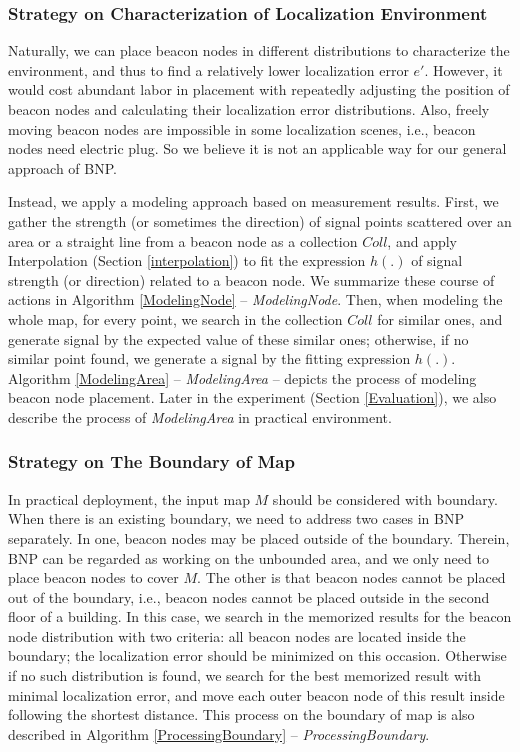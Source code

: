 \documentclass[10pt, conference, letterpaper]{IEEEtran}
\begin{document}
\subsubsection{Strategy on Characterization of Localization Environment}
Naturally, we can place beacon nodes in different distributions to characterize the environment, and thus to find a relatively lower localization error $e'$. However, it would cost abundant labor in placement with repeatedly adjusting the position of beacon nodes and calculating their localization error distributions. Also, freely moving beacon nodes are impossible in some localization scenes, i.e., beacon nodes need electric plug. So we believe it is not an applicable way for our general approach of BNP.

Instead, we apply a modeling approach based on measurement results. First, we gather the strength (or sometimes the direction) of signal points scattered over an area or a straight line from a beacon node as a collection $Coll$, and apply Interpolation (Section \ref{interpolation}) to fit the expression $h(.)$ of signal strength (or direction) related to a beacon node. We summarize these course of actions in Algorithm \ref{ModelingNode} -- \textit{ModelingNode}. Then, when modeling the whole map, for every point, we search in the collection $Coll$ for similar ones, and generate signal by the expected value of these similar ones; otherwise, if no similar point found, we generate a signal by the fitting expression $h(.)$. Algorithm \ref{ModelingArea} -- \textit{ModelingArea} -- depicts the process of modeling beacon node placement. Later in the experiment (Section \ref{Evaluation}), we also describe the process of \textit{ModelingArea} in practical environment.

\subsubsection{Strategy on The Boundary of Map}
In practical deployment, the input map $M$ should be considered with boundary. When there is an existing boundary, we need to address two cases in BNP separately. In one, beacon nodes may be placed outside of the boundary. Therein, BNP can be regarded as working on the unbounded area, and we only need to place beacon nodes to cover $M$. The other is that beacon nodes cannot be placed out of the boundary, i.e., beacon nodes cannot be placed outside in the second floor of a building. In this case, we search in the memorized results for the beacon node distribution with two criteria: all beacon nodes are located inside the boundary; the localization error should be minimized on this occasion. Otherwise if no such distribution is found, we search for the best memorized result with minimal localization error, and move each outer beacon node of this result inside following the shortest distance. This process on the boundary of map is also described in Algorithm \ref{ProcessingBoundary} -- \textit{ProcessingBoundary}.
\end{document}
